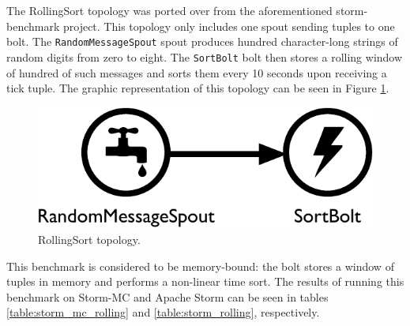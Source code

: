\documentclass[bsc,twoside,singlespacing,normalheadings,parskip]{infthesis}\usepackage[]{graphicx}\usepackage[]{color}
\begin{document}
The RollingSort topology was ported over from the aforementioned storm-benchmark project. This topology only includes one spout sending tuples to one bolt. The \texttt{RandomMessageSpout} spout produces hundred character-long strings of random digits from zero to eight. The \texttt{SortBolt} bolt then stores a rolling window of hundred of such messages and sorts them every 10 seconds upon receiving a tick tuple. The graphic representation of this topology can be seen in Figure \ref{fig:rolling_topology}.

\begin{figure}[!htb]
	\centering
	\includegraphics[scale=0.475]{pdf/rolling_topology.pdf}
	\caption{RollingSort topology.}
	\label{fig:rolling_topology}
\end{figure}

This benchmark is considered to be memory-bound: the bolt stores a window of tuples in memory and performs a non-linear time sort. The results of running this benchmark on Storm-MC and Apache Storm can be seen in tables \ref{table:storm_mc_rolling} and \ref{table:storm_rolling}, respectively.
\end{document}
